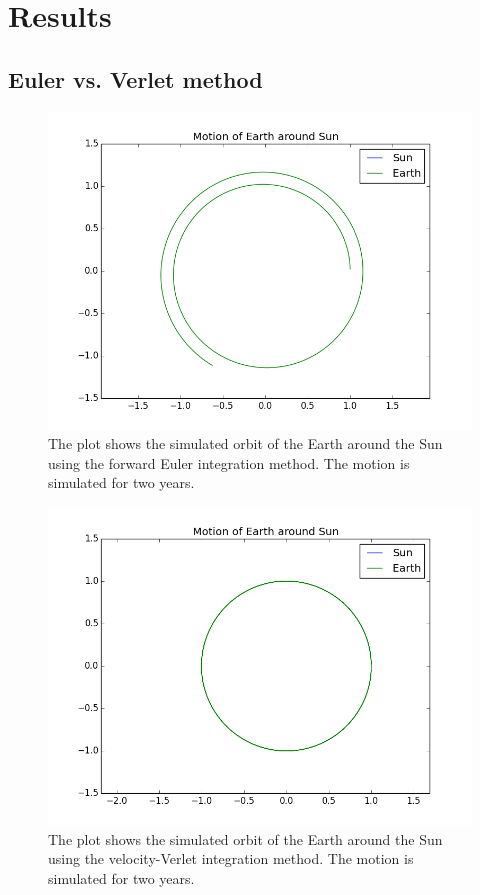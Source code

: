 \section{Results}

\subsection{Euler vs. Verlet method}
\begin{figure}
\includegraphics[scale=0.7]{figures/earth_sun_euler}
\caption{The plot shows the simulated orbit of the Earth around the Sun using the forward Euler integration method. The motion is simulated for two years.}
\end{figure}

\begin{figure}
\includegraphics[scale=0.7]{figures/earth_sun_verlet}
\caption{The plot shows the simulated orbit of the Earth around the Sun using the velocity-Verlet integration method. The motion is simulated for two years.}
\end{figure}

